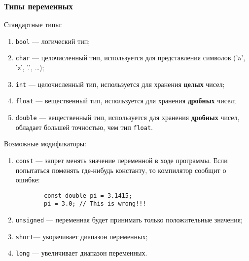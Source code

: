 \subsubsection{Типы переменных}
Стандартные типы:
\begin{enumerate}
    \item \lstinline|bool| --- логический тип;
    \item \lstinline|char| --- целочисленный тип, используется для представления символов ('a', 'z', '.', \ldots);
    \item \lstinline|int| --- целочисленный тип, используется для хранения \textbf{целых} чисел;
    \item \lstinline|float| --- вещественный тип, используется для хранения \textbf{дробных} чисел;
    \item \lstinline|double| --- вещественный тип, используется для хранения \textbf{дробных} чисел, обладает большей точностью, чем тип \lstinline|float|.
\end{enumerate}

Возможные модификаторы:
\begin{enumerate}
    \item \lstinline|const| --- запрет менять значение переменной в ходе программы. Если попытаться поменять где-нибудь константу, то компилятор сообщит о ошибке:
    \begin{lstlisting}
        const double pi = 3.1415;
        pi = 3.0; // This is wrong!!!
    \end{lstlisting}
    \item \lstinline|unsigned| --- переменная будет принимать только положительные значения;
    \item \lstinline|short|--- укорачивает диапазон переменных;
    \item \lstinline|long| --- увеличивает диапазон переменных.
\end{enumerate}

